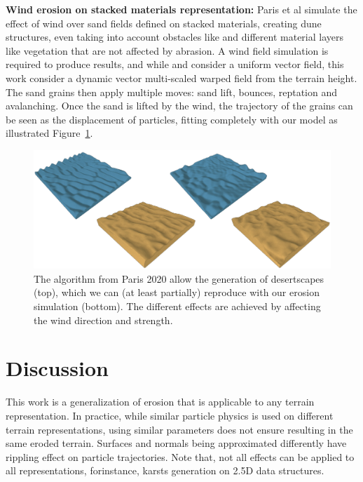 \textbf{Wind erosion on stacked materials representation: }
Paris et al \cite{Paris2020} simulate the effect of wind over sand fields defined on stacked materials, creating dune structures, even taking into account obstacles like \cite{Roa2004} and different material layers like vegetation \cite{Cordonnier2017a} that are not affected by abrasion\cite{Paris2020}. A wind field simulation is required to produce results, and while \cite{Roa2004} and \cite{Onoue2000} consider a uniform vector field, this work consider a dynamic vector multi-scaled warped field from the terrain height. The sand grains then apply multiple moves: sand lift, bounces, reptation and avalanching. Once the sand is lifted by the wind, the trajectory of the grains can be seen as the displacement of particles, fitting completely with our model as illustrated Figure~\ref{fig:erosion_screen-paris2020}.
\begin{figure}[ht!]
\centering
\includegraphics{otherPapersRepro/desert.pdf}
\caption{The algorithm from Paris 2020 allow the generation of desertscapes (top), which we can (at least partially) reproduce with our erosion simulation (bottom). The different effects are achieved by affecting the wind direction and strength. }
\label{fig:erosion_screen-paris2020}
\end{figure}

\section{Discussion}
This work is a generalization of erosion that is applicable to any terrain representation. In practice, while similar particle physics is used on different terrain representations, using similar parameters does not ensure resulting in the same eroded terrain. Surfaces and normals being approximated differently have rippling effect on particle trajectories. 
Note that, not all effects can be applied to all representations, forinstance, karsts generation on 2.5D data structures. 

